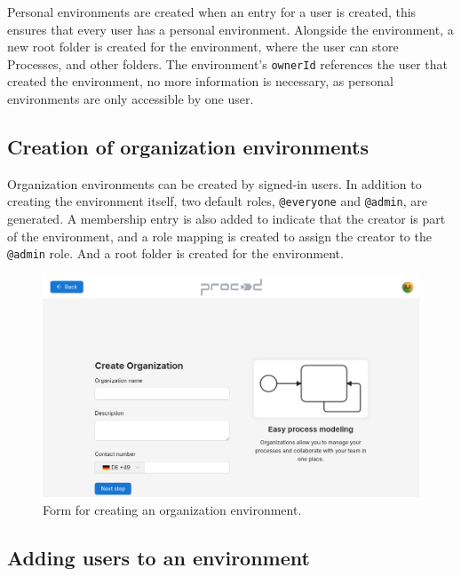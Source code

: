 Personal environments are created when an entry for a user is created, this ensures that
every user has a personal environment.
Alongside the environment, a new root folder is created for the environment, where the
user can store Processes, and other folders.
The environment's \lstinline{ownerId} references the user that created the environment,
no more information is necessary, as personal environments are only accessible by one
user.

\subsection{Creation of organization environments}

Organization environments can be created by signed-in users.
In addition to creating the environment itself, two default roles, 
\lstinline{@everyone} and \lstinline{@admin}, are generated.
A membership entry is also added to indicate that the creator is part of the environment,
and a role mapping is created to assign the creator to the \lstinline{@admin} role.
And a root folder is created for the environment.

\begin{figure}[H]
    \centering
    \includegraphics[scale=0.3]{images/create-organization-ui.png}
    \caption{Form for creating an organization environment.}
    \vspace{-1em} %
    \label{fig:prompt-fill-personal-information}
\end{figure}

\subsection{Adding users to an environment}

